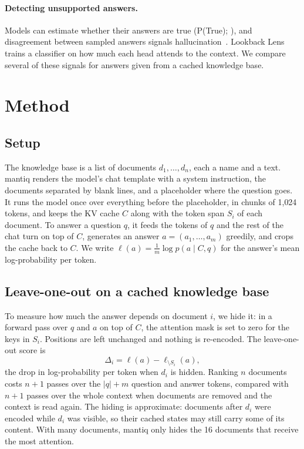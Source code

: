 \documentclass[11pt]{article}
\begin{document}
\paragraph{Detecting unsupported answers.} Models can estimate whether their answers are true (P(True); \citealp{kadavath2022know}), and disagreement between sampled answers signals hallucination~\citep{manakul2023selfcheckgpt,kuhn2023semantic}. Lookback Lens~\citep{chuang2024lookback} trains a classifier on how much each head attends to the context. We compare several of these signals for answers given from a cached knowledge base.

\section{Method}
\label{sec:method}

\subsection{Setup}
The knowledge base is a list of documents $d_1,\dots,d_n$, each a name and a text. mantiq renders the model's chat template with a system instruction, the documents separated by blank lines, and a placeholder where the question goes. It runs the model once over everything before the placeholder, in chunks of 1{,}024 tokens, and keeps the KV cache $C$ along with the token span $S_i$ of each document. To answer a question $q$, it feeds the tokens of $q$ and the rest of the chat turn on top of $C$, generates an answer $a = (a_1,\dots,a_m)$ greedily, and crops the cache back to $C$. We write $\ell(a) = \frac{1}{m}\log p(a \mid C, q)$ for the answer's mean log-probability per token.

\subsection{Leave-one-out on a cached knowledge base}
\label{sec:loo}
To measure how much the answer depends on document $i$, we hide it: in a forward pass over $q$ and $a$ on top of $C$, the attention mask is set to zero for the keys in $S_i$. Positions are left unchanged and nothing is re-encoded. The leave-one-out score is
\begin{equation}
\Delta_i = \ell(a) - \ell_{\setminus S_i}(a),
\end{equation}
the drop in log-probability per token when $d_i$ is hidden. Ranking $n$ documents costs $n+1$ passes over the $|q|+m$ question and answer tokens, compared with $n+1$ passes over the whole context when documents are removed and the context is read again. The hiding is approximate: documents after $d_i$ were encoded while $d_i$ was visible, so their cached states may still carry some of its content. With many documents, mantiq only hides the 16 documents that receive the most attention.
\end{document}
